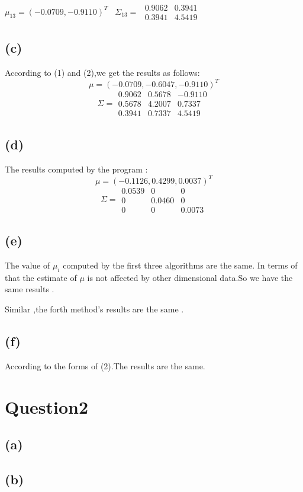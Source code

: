 \documentclass[10pt,a4paper]{article}
\begin{document}
	$\mu_{13}=(-0.0709,-0.9110)^T$ \ $\Sigma_{13}=$
	$\begin{array}{cc}
	0.9062& 0.3941  \\ 
	0.3941& 4.5419 
	\end{array} 
	$
	\subsection{(c)}
	According to (1) and (2),we get the results as follows:
	\begin{equation*}
	\mu=(-0.0709,-0.6047,-0.9110)^T
	\end{equation*}
	\begin{equation*}
	\Sigma=\begin{array}{ccc}
	0.9062& 0.5678  & -0.9110  \\ 
	0.5678& 4.2007 & 0.7337  \\ 
	0.3941& 0.7337  &4.5419 
	\end{array} 
	\end{equation*}
	\subsection{(d)}
	The results computed by the program :
	\begin{equation*}
	\mu=(-0.1126,0.4299,0.0037)^T
	\end{equation*}
	\begin{equation*}
	\Sigma=\begin{array}{ccc}
	0.0539& 0  & 0 \\ 
	0& 0.0460  & 0  \\ 
	0& 0 & 0.0073 
	\end{array} 
	\end{equation*}
	\subsection{(e)}
	The value of $\mu_i$ computed by the first three algorithms are the same.
	In terms of that the estimate of $\mu $ is not affected by other dimensional data.So we have the same results .
	
	Similar ,the forth method's results are the same .
	\subsection{(f)}
	According to the forms of (2).The results are the same.
\section{Question2}
\subsection{(a)}
\subsection{(b)}
\end{document}
